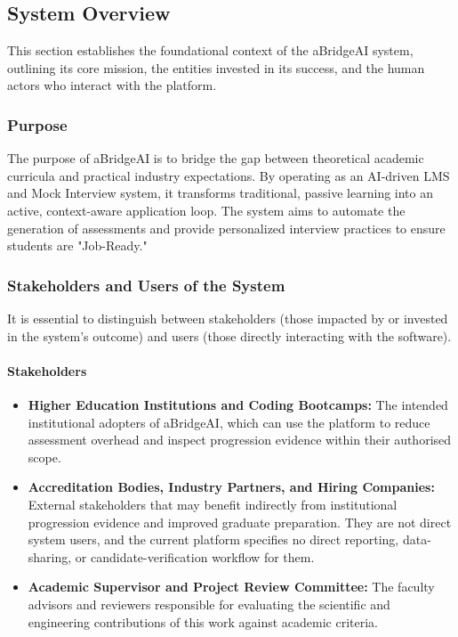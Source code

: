 \subsection{System Overview}
This section establishes the foundational context of the aBridgeAI system, outlining its core mission, the entities invested in its success, and the human actors who interact with the platform.

\subsubsection{Purpose}
The purpose of aBridgeAI is to bridge the gap between theoretical academic curricula and practical industry expectations. By operating as an AI-driven LMS and Mock Interview system, it transforms traditional, passive learning into an active, context-aware application loop. The system aims to automate the generation of assessments and provide personalized interview practices to ensure students are "Job-Ready."

\subsubsection{Stakeholders and Users of the System}
It is essential to distinguish between stakeholders (those impacted by or invested in the system's outcome) and users (those directly interacting with the software).

\paragraph{Stakeholders}
\begin{itemize}
    \item \textbf{Higher Education Institutions and Coding Bootcamps:}
    The intended institutional adopters of aBridgeAI, which can use
    the platform to reduce assessment overhead and inspect progression
    evidence within their authorised scope.

    \item \textbf{Accreditation Bodies, Industry Partners, and Hiring Companies:}
    External stakeholders that may benefit indirectly from institutional
    progression evidence and improved graduate preparation. They are not
    direct system users, and the current platform specifies no direct
    reporting, data-sharing, or candidate-verification workflow for them.
 
    \item \textbf{Academic Supervisor and Project Review Committee:}
    The faculty advisors and reviewers responsible for evaluating
    the scientific and engineering contributions of this work
    against academic criteria.
\end{itemize}

